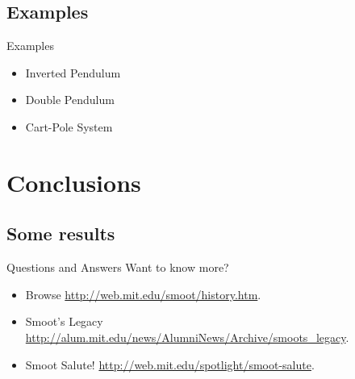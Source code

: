 \documentclass{beamer}
\begin{document}
\subsection{Examples}
\begin{frame}{Examples}
  \begin{itemize}
    \item<1-> Inverted Pendulum
    \item<2-> Double Pendulum
    \item<3-> Cart-Pole System
  \end{itemize}
\end{frame}

\section{Conclusions}
\subsection{Some results}
\begin{frame}{Questions and Answers}
  Want to know more?

  \begin{itemize}
    \item Browse \url{http://web.mit.edu/smoot/history.htm}.
    \item Smoot's Legacy \url{http://alum.mit.edu/news/AlumniNews/Archive/smoots_legacy}.
    \item Smoot Salute! \url{http://web.mit.edu/spotlight/smoot-salute}.
  \end{itemize}

\end{frame}
\end{document}
